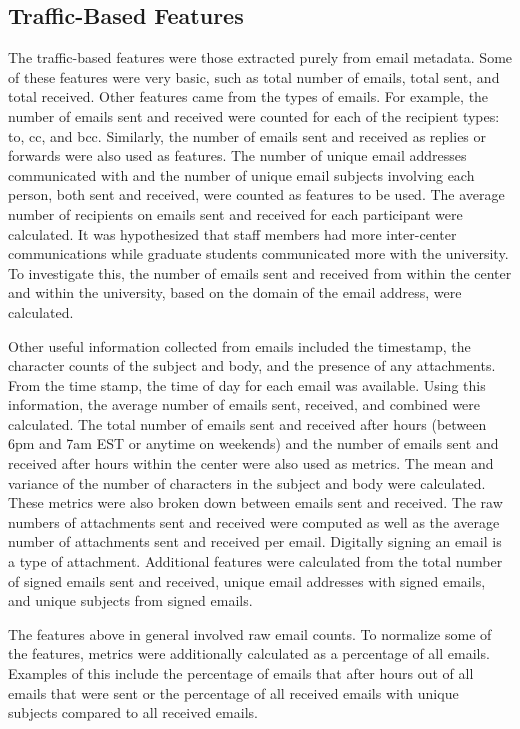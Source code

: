\documentclass{article}
\begin{document}
\subsection{Traffic-Based Features}
The traffic-based features were those extracted purely from email metadata.  Some of these features were very basic, such as total number of emails, total sent, and total received.  Other features came from the types of emails.  For example, the number of emails sent and received were counted for each of the recipient types: to, cc, and bcc.  Similarly, the number of emails sent and received as replies or forwards were also used as features.  The number of unique email addresses communicated with and the number of unique email subjects involving each person, both sent and received, were counted as features to be used.  The average number of recipients on emails sent and received for each participant were calculated.  It was hypothesized that staff members had more inter-center communications while graduate students communicated more with the university.  To investigate this, the number of emails sent and received from within the center and within the university, based on the domain of the email address, were calculated.  
\par
Other useful information collected from emails included the timestamp, the character counts of the subject and body, and the presence of any attachments. From the time stamp, the time of day for each email was available.  Using this information, the average number of emails sent, received, and combined were calculated.  The total number of emails sent and received after hours (between 6pm and 7am EST or anytime on weekends) and the number of emails sent and received after hours within the center were also used as metrics.  The mean and variance of the number of characters in the subject and body were calculated.  These metrics were also broken down between emails sent and received.  The raw numbers of attachments sent and received were computed as well as the average number of attachments sent and received per email.  Digitally signing an email is a type of attachment.  Additional features were calculated from the total number of signed emails sent and received, unique email addresses with signed emails, and unique subjects from signed emails.
\par
The features above in general involved raw email counts.  To normalize some of the features, metrics were additionally calculated as a percentage of all emails. Examples of this include the percentage of emails that after hours out of all emails that were sent or the percentage of all received emails with unique subjects compared to all received emails.
\end{document}
